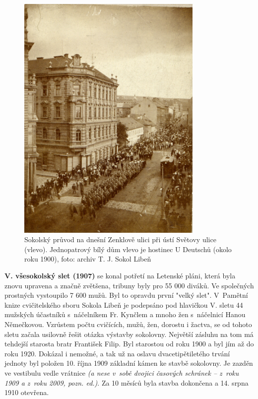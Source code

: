 \documentclass[a5paper, 11pt, twoside]{article}
\newcommand{\pozned}[1]{%
\textit{#1}}
\begin{document}
\begin{figure}[h!]
  \centering
  \includegraphics[width=0.8\textwidth]{img/16_pruvod_1900.jpg}
  \caption*{Sokolský průvod na dnešní Zenklově ulici při ústí Světovy ulice (vlevo). Jednopatrový bílý dům vlevo je hostinec U Deutschů (okolo roku 1900), foto: archiv T. J. Sokol Libeň}
\end{figure}

\clearpage

\textbf{V. všesokolský slet (1907)} se konal potřetí na Letenské pláni, která byla znovu upravena a značně zvětšena, tribuny byly pro 55 000 diváků. Ve společných prostných vystoupilo 7 600 mužů. Byl to opravdu první "velký slet". V~Pamětní knize cvičitelského sboru Sokola Libeň je podepsáno pod hlavičkou V. sletu 44 mužských účastníků s~náčelníkem Fr. Kynčlem a mnoho žen s~náčelnicí Hanou Němečkovou. Vzrůstem počtu cvičících, mužů, žen, dorostu i žactva, se od tohoto sletu začala usilovně řešit otázka výstavby sokolovny. Největší zásluhu na tom má tehdejší starosta bratr František Filip. Byl starostou od roku 1900 a byl jím až do roku 1920. Dokázal i nemožné, a tak už na oslavu dvacetipětiletého trvání jednoty byl položen 10. října 1909 základní kámen ke stavbě sokolovny. Je zazděn ve vestibulu vedle vrátnice \pozned{(a nese v~sobě dvojici časových schránek – z~roku 1909 a z~roku 2009, pozn. ed.)}. Za 10 měsíců byla stavba dokončena a 14. srpna 1910 otevřena.
\end{document}
